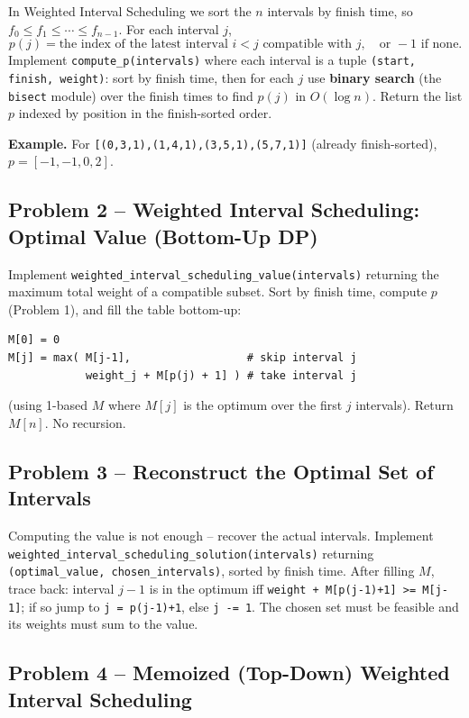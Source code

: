 \documentclass[11pt]{article}
\begin{document}
In Weighted Interval Scheduling we sort the $n$ intervals by finish time, so
$f_0 \le f_1 \le \cdots \le f_{n-1}$. For each interval $j$,
\[
p(j) = \text{the index of the latest interval } i < j \text{ compatible with } j,
\quad \text{or } -1 \text{ if none.}
\]
Implement \texttt{compute\_p(intervals)} where each interval is a tuple
\texttt{(start, finish, weight)}: sort by finish time, then for each $j$ use
\textbf{binary search} (the \texttt{bisect} module) over the finish times to find $p(j)$ in
$O(\log n)$. Return the list $p$ indexed by position in the finish-sorted order.

\textbf{Example.} For \texttt{[(0,3,1),(1,4,1),(3,5,1),(5,7,1)]} (already finish-sorted),
$p = [-1, -1, 0, 2]$.

\subsection*{Problem 2 -- Weighted Interval Scheduling: Optimal Value (Bottom-Up DP)}

Implement \texttt{weighted\_interval\_scheduling\_value(intervals)} returning the maximum
total weight of a compatible subset. Sort by finish time, compute $p$ (Problem 1), and fill
the table bottom-up:
\begin{verbatim}
M[0] = 0
M[j] = max( M[j-1],                  # skip interval j
            weight_j + M[p(j) + 1] ) # take interval j
\end{verbatim}
(using 1-based $M$ where $M[j]$ is the optimum over the first $j$ intervals). Return
$M[n]$. No recursion.

\subsection*{Problem 3 -- Reconstruct the Optimal Set of Intervals}

Computing the value is not enough -- recover the actual intervals. Implement
\texttt{weighted\_interval\_scheduling\_solution(intervals)} returning
\texttt{(optimal\_value, chosen\_intervals)}, sorted by finish time. After filling $M$,
trace back: interval $j-1$ is in the optimum iff
\texttt{weight + M[p(j-1)+1] >= M[j-1]}; if so jump to \texttt{j = p(j-1)+1}, else
\texttt{j -= 1}. The chosen set must be feasible and its weights must sum to the value.

\subsection*{Problem 4 -- Memoized (Top-Down) Weighted Interval Scheduling}
\end{document}
